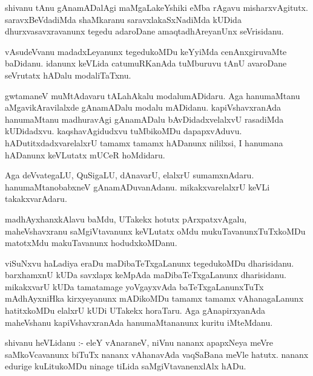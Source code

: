 \documentclass{article}
\begin{document}
\begin{mn}
shivanu  tAnu  gAnamADalAgi  maMgaLakeYshiki  eMba  rAgavu  misharxvAgitutx.  saravxBeVdadiMda  shaMkaranu  
saravxlakaSxNadiMda  kUDida  dhurxvasavxravanunx  tegedu  adaroDane  amaqtadhAreyanUnx  seVrisidanu.
\end{mn}

\begin{mn}
vAsudeVvanu  madadxLeyanunx  tegedukoMDu  keYyiMda  cenAnxgiruvaMte  baDidanu.  idanunx  keVLida  
catumuRKanAda  tuMburuvu  tAnU  avaroDane  seVrutatx  hADalu  modaliTaTxnu.
\end{mn}

\begin{mn}
gwtamaneV  muMtAdavaru  tALahAkalu  modalumADidaru.  Aga  hanumaMtanu  aMgavikAravilalxde  gAnamADalu  
modalu  mADidanu.  kapiVshavxranAda  hanumaMtanu  madhuravAgi  gAnamADalu  bAvDidadxvelalxvU  rasadiMda  
kUDidadxvu.  kaqshavAgidudxvu  tuMbikoMDu  dapapxvAduvu.  hADutitxdadxvarelalxrU  tamamx  tamamx  hADanunx  
nililxsi,  I  hanumana  hADanunx  keVLutatx  mUCeR hoMdidaru.
\end{mn}

\begin{mn}
Aga  deVvategaLU,  QuSigaLU,  dAnavarU,  elalxrU  sumamxnAdaru.  hanumaMtanobabxneV  gAnamADuvanAdanu.  
mikakxvarelalxrU  keVLi  takakxvarAdaru.
\end{mn}

\begin{mn}
madhAyxhanxkAlavu  baMdu,  UTakekx  hotutx  pArxpatxvAgalu,  maheVshavxranu  saMgiVtavanunx  keVLutatx  
oMdu  mukuTavanunxTuTxkoMDu  matotxMdu  makuTavanunx  hodudxkoMDanu.
\end{mn}

\begin{mn}
viSuNxvu  haLadiya  eraDu  maDibaTeTxgaLanunx  tegedukoMDu  dharisidanu.  barxhamxnU  kUDa  savxlapx  
keMpAda  maDibaTeTxgaLanunx  dharisidanu.  mikakxvarU  kUDa  tamatamage  yoVgayxvAda  baTeTxgaLanunxTuTx  
mAdhAyxniHka  kirxyeyanunx  mADikoMDu  tamamx  tamamx  vAhanagaLanunx  hatitxkoMDu  elalxrU  kUDi  UTakekx  
horaTaru.  Aga  gAnapirxyanAda  maheVshanu  kapiVshavxranAda  hanumaMtananunx  kuritu  iMteMdanu.
\end{mn}

\begin{mn}
shivanu  heVLidanu :- eleY  vAnaraneV,  niVnu  nananx  apapxNeya  meVre  saMkoVcavanunx  biTuTx  nananx  
vAhanavAda  vaqSaBana  meVle  hatutx.  nananx  edurige  kuLitukoMDu  ninage  tiLida  saMgiVtavanenxlAlx  hADu.
\end{mn}
\end{document}

